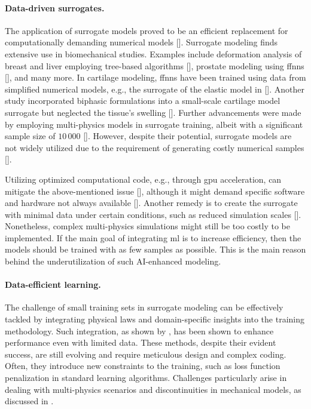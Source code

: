 \documentclass[12pt,a4paper]{report}
\begin{document}
\paragraph{Data-driven surrogates.} The application of surrogate models proved to be an efficient replacement for computationally demanding numerical models [\cite{cai2021,liu2019,martinez2017}]. Surrogate modeling finds extensive use in biomechanical studies. Examples include deformation analysis of breast and liver employing tree-based algorithms [\cite{martin-guerrero2016}], prostate modeling using \acp{ffnn} [\cite{jahya2013}], and many more. In cartilage modeling, \acp{ffnn} have been trained using data from simplified numerical models, e.g., the surrogate of the elastic model in [\cite{paiva2012}]. Another study incorporated biphasic formulations into a small-scale cartilage model surrogate but neglected the tissue's swelling [\cite{arbabi2016a}]. Further advancements were made by employing multi-physics models in surrogate training, albeit with a significant sample size of $10\,000$ [\cite{arbabi2016b}]. However, despite their potential, surrogate models are not widely utilized due to the requirement of generating costly numerical samples [\cite{frank2020}].

Utilizing optimized computational code, e.g., through \ac{gpu} acceleration, can mitigate the above-mentioned issue [\cite{johnsen2015}], although it might demand specific software and hardware not always available [\cite{marinkovic2019}]. Another remedy is to create the surrogate with minimal data under certain conditions, such as reduced simulation scales [\cite{faisal2023}]. Nonetheless, complex multi-physics simulations might still be too costly to be implemented. If the main goal of integrating \ac{ml} is to increase efficiency, then the models should be trained with as few samples as possible. This is the main reason behind the underutilization of such AI-enhanced modeling.

\paragraph{Data-efficient learning.} The challenge of small training sets in surrogate modeling can be effectively tackled by integrating physical laws and domain-specific insights into the training methodology. Such integration, as shown by \cite{kashinath2021,linka2021,hoerig2020}, has been shown to enhance performance even with limited data. These methods, despite their evident success, are still evolving and require meticulous design and complex coding. Often, they introduce new constraints to the training, such as loss function penalization in standard learning algorithms. Challenges particularly arise in dealing with multi-physics scenarios and discontinuities in mechanical models, as discussed in \cite{coutinho2023,cai2021b,karniadakis2021,fuks2020}.
\end{document}
